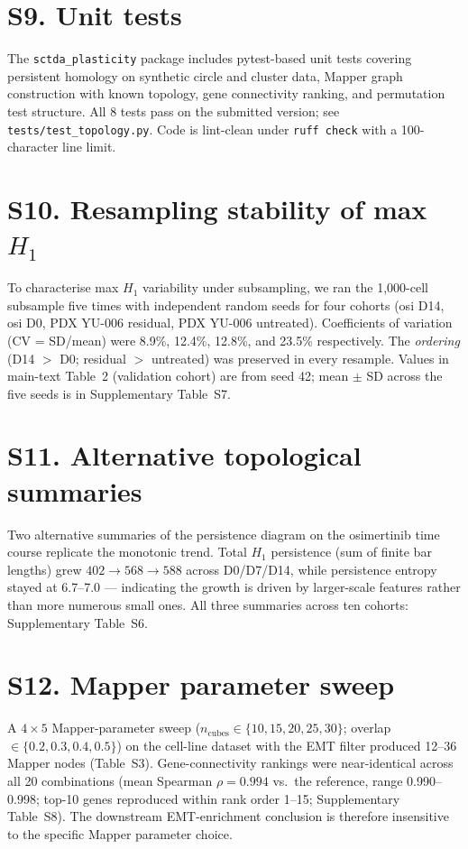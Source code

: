\documentclass[11pt,a4paper]{article}
\begin{document}
\section*{S9. Unit tests}

The \texttt{sctda\_plasticity} package includes pytest-based unit tests
covering persistent homology on synthetic circle and cluster data,
Mapper graph construction with known topology, gene connectivity
ranking, and permutation test structure. All 8 tests pass on the
submitted version; see \texttt{tests/test\_topology.py}. Code is
lint-clean under \texttt{ruff check} with a 100-character line limit.

\section*{S10. Resampling stability of max $H_1$}

To characterise max $H_1$ variability under subsampling, we ran the
1{,}000-cell subsample five times with independent random seeds for
four cohorts (osi D14, osi D0, PDX YU-006 residual, PDX YU-006
untreated). Coefficients of variation (CV = SD/mean) were 8.9\%,
12.4\%, 12.8\%, and 23.5\% respectively. The \emph{ordering}
(D14 $>$ D0; residual $>$ untreated) was preserved in every resample.
Values in main-text Table~2 (validation cohort) are from seed 42;
mean $\pm$ SD across the five seeds is in Supplementary Table~S7.

\section*{S11. Alternative topological summaries}

Two alternative summaries of the persistence diagram on the
osimertinib time course replicate the monotonic trend. Total $H_1$
persistence (sum of finite bar lengths) grew $402 \to 568 \to 588$
across D0/D7/D14, while persistence entropy stayed at 6.7--7.0 ---
indicating the growth is driven by larger-scale features rather than
more numerous small ones. All three summaries across ten cohorts:
Supplementary Table~S6.

\section*{S12. Mapper parameter sweep}

A $4 \times 5$ Mapper-parameter sweep (\(n_{\text{cubes}} \in
\{10, 15, 20, 25, 30\}\); overlap \(\in \{0.2, 0.3, 0.4, 0.5\}\)) on
the cell-line dataset with the EMT filter produced 12--36 Mapper
nodes (Table~S3). Gene-connectivity rankings were near-identical
across all 20 combinations (mean Spearman \(\rho = 0.994\) vs.~the
reference, range 0.990--0.998; top-10 genes reproduced within rank
order 1--15; Supplementary Table~S8). The downstream EMT-enrichment
conclusion is therefore insensitive to the specific Mapper parameter
choice.
\end{document}
